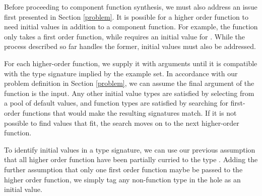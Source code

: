 Before proceeding to component function synthesis, we must also address an issue first presented in Section \ref{problem}.
It is possible for a higher order function to need initial values in addition to a component function.
For example, the  function only takes a first order function, while  requires an initial value for .
While the process described so far handles the former, initial values must also be addressed.

For each higher-order function, we supply it with arguments until it is compatible with the type signature implied by the example set. In accordance with our problem definition in Section \ref{problem}, we can assume the final argument of the function is the input. Any other initial value types are satisfied by selecting from a pool of default values, and function types are satisfied by searching for first-order functions that would make the resulting signatures match. If it is not possible to find values that fit, the search moves on to the next higher-order function.

To identify initial values in a type signature, we can use our previous assumption that all higher order function have been partially curried to the type \codeinline{_ -> *-> *}. Adding the further assumption that only one first order function maybe be passed to the higher order function, we simply tag any non-function type in the hole as an initial value.



